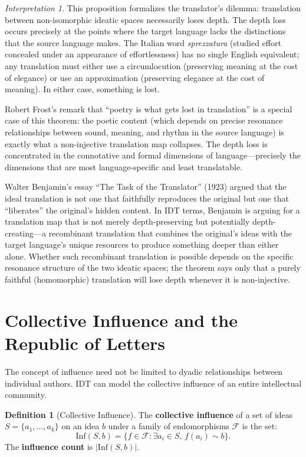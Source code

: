 \documentclass[11pt,openany]{book}
\theoremstyle{definition}
\newtheorem{definition}[axiom]{Definition}
\theoremstyle{plain}
\theoremstyle{remark}
\newtheorem{interpretation}[axiom]{Interpretation}
\newcommand{\res}{\sim}                      %
\begin{document}
\begin{interpretation}
This proposition formalizes the translator's dilemma: translation between non-isomorphic ideatic spaces necessarily loses depth. The depth loss occurs precisely at the points where the target language lacks the distinctions that the source language makes. The Italian word \emph{sprezzatura} (studied effort concealed under an appearance of effortlessness) has no single English equivalent; any translation must either use a circumlocution (preserving meaning at the cost of elegance) or use an approximation (preserving elegance at the cost of meaning). In either case, something is lost.

Robert Frost's remark that ``poetry is what gets lost in translation'' is a special case of this theorem: the poetic content (which depends on precise resonance relationships between sound, meaning, and rhythm in the source language) is exactly what a non-injective translation map collapses. The depth loss is concentrated in the connotative and formal dimensions of language---precisely the dimensions that are most language-specific and least translatable.

Walter Benjamin's essay ``The Task of the Translator'' (1923) argued that the ideal translation is not one that faithfully reproduces the original but one that ``liberates'' the original's hidden content. In IDT terms, Benjamin is arguing for a translation map that is not merely depth-preserving but potentially depth-creating---a recombinant translation that combines the original's ideas with the target language's unique resources to produce something deeper than either alone. Whether such recombinant translation is possible depends on the specific resonance structure of the two ideatic spaces; the theorem says only that a purely faithful (homomorphic) translation will lose depth whenever it is non-injective.
\end{interpretation}

\section{Collective Influence and the Republic of Letters}

The concept of influence need not be limited to dyadic relationships between individual authors. IDT can model the collective influence of an entire intellectual community.

\begin{definition}[Collective Influence]
The \textbf{collective influence} of a set of ideas $S = \{a_1, \ldots, a_k\}$ on an idea $b$ under a family of endomorphisms $\mathcal{F}$ is the set:
\[
\mathrm{Inf}(S, b) = \{f \in \mathcal{F} : \exists a_i \in S, \, f(a_i) \res b\}.
\]
The \textbf{influence count} is $|\mathrm{Inf}(S, b)|$.
\end{definition}
\end{document}
